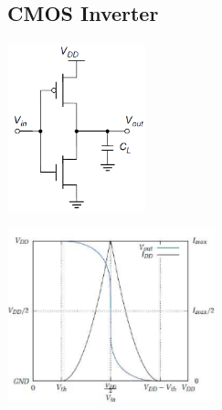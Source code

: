 	\subsection{CMOS Inverter}
		\begin{center}
			\begin{multicols}{2}
				\includegraphics[width=4cm]{bilder/cmosInverterSchema.png}\\
				\columnbreak
				
				\includegraphics[width=6cm]{bilder/cmosInverterSignal.png}\\
			\end{multicols}
		\end{center}
